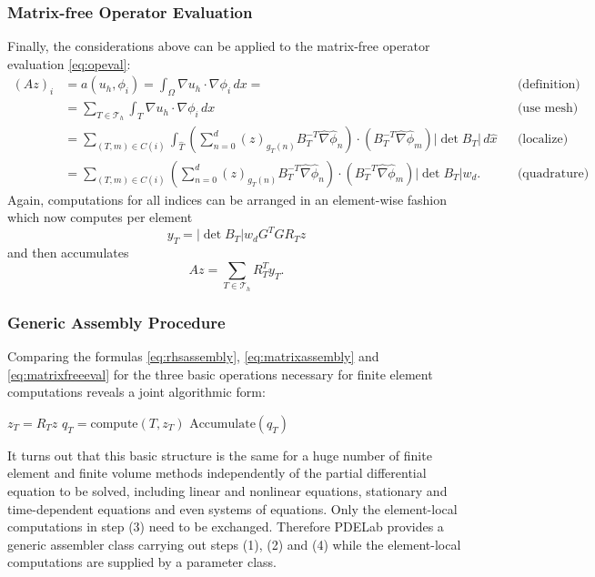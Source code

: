 \documentclass[a4paper,12pt]{article}
\begin{document}
\subsubsection*{Matrix-free Operator Evaluation}

Finally, the considerations above can be applied to the matrix-free operator
evaluation \eqref{eq:opeval}:
\begin{align*}
(Az)_i  &= a(u_h,\phi_i) =  \int_\Omega \nabla u_h \cdot \nabla \phi_i \,dx =
&&\text{(definition)} \\ 
&= \sum_{T\in\mathcal{T}_h} \int_T \nabla u_h \cdot \nabla \phi_i \,dx
&&\text{(use mesh)}\\
&= \sum_{(T,m)\in C(i)}
\int_{\hat T} 
\left(\sum_{n=0}^d (z)_{g_T(n)} B_T^{-T} \hat\nabla\hat\phi_n\right)
\cdot (B_T^{-T} \hat\nabla\hat\phi_m) |\det B_T| \,d\hat x &&\text{(localize)}\\
&= \sum_{(T,m)\in C(i)}
\left(\sum_{n=0}^d (z)_{g_T(n)} B_T^{-T} \hat\nabla\hat\phi_n\right)
\cdot (B_T^{-T} \hat\nabla\hat\phi_m) |\det B_T| w_d . &&\text{(quadrature)}
\end{align*}
Again, computations for all indices can be arranged in an element-wise fashion
which now computes per element
\begin{equation}
y_T = |\det B_T| w_d G^T G R_T z
\label{eq:alpha_volume}
\end{equation}
and then accumulates
\begin{equation}
Az =  \sum_{T\in\mathcal{T}_h} R_T^T y_T.
\label{eq:matrixfreeeval}
\end{equation}

\subsubsection*{Generic Assembly Procedure}

Comparing the formulas \eqref{eq:rhsassembly}, \eqref{eq:matrixassembly}
and \eqref{eq:matrixfreeeval} for the three basic operations necessary for
finite element computations reveals a joint algorithmic form:
\begin{algorithmic}[1]
 
\State $z_T = R_T z$ 
\State $q_T=\text{compute}(T,z_T)$ 
\State $\text{Accumulate}(q_T)$ 
\EndFor
\end{algorithmic}

It turns out that this basic structure is the same for a huge number
of  finite element and finite volume methods independently of
the partial differential equation to be solved, including linear
and nonlinear equations, stationary and time-dependent equations
and even systems of equations. Only the element-local
computations in step (3) need to be exchanged. Therefore PDELab
provides a generic assembler class carrying out steps (1), (2) and (4)
while the element-local computations are supplied by a parameter class.
\end{document}
